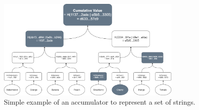 \documentclass[../main.tex]{subfiles}
\begin{document}
                \begin{figure}[htp]
                    \centering
                    \includegraphics[width=0.8\textwidth]{../Images/AccumulatorExample.png}
                    \caption{Simple example of an accumulator to represent a set of strings.}
                    \label{fig:accumulator_example}
                \end{figure}
                
\end{document}
